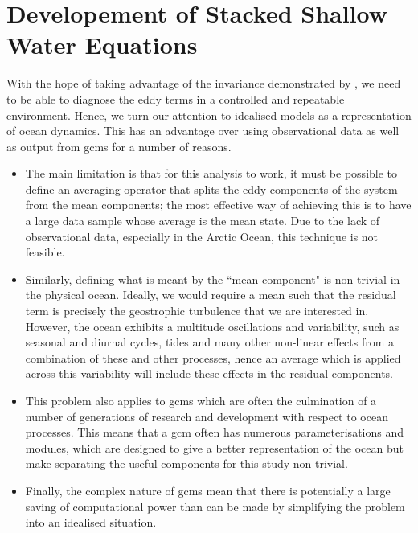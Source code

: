 \documentclass[12pt,a4paper]{report}
\begin{document}
\chapter{Developement of Stacked Shallow Water Equations}
\label{sweq}

With the hope of taking advantage of the invariance demonstrated by 
\cite{maddison2013eliassen}, we need to be able to diagnose the
eddy terms in a controlled and repeatable environment. Hence, we turn our attention to
idealised models as a representation of ocean dynamics. This has an advantage 
over using observational data as well as output from \glspl{gcm} for a number of reasons.
\begin{itemize}
	\item The main limitation is that for this analysis to work, it must be possible to define an
	averaging operator that splits the eddy components of the system from the mean
	components; the most effective way of achieving this is to have a large data sample
	whose average is the mean state. Due to the lack of observational data, especially in the
	Arctic Ocean, this  technique is not feasible.
	\item Similarly, defining what is meant by the ``mean component" is non-trivial in the physical ocean. Ideally, we would require a mean such that the residual term is precisely the 
	geostrophic turbulence that we are interested in. However, the ocean exhibits a multitude 
	oscillations and variability, such as seasonal and diurnal cycles, tides and many other
	non-linear effects from a combination of these and other processes, hence an average which
	is applied across this variability will include these effects in the residual components.
	\item This problem also applies to \glspl{gcm} which are often the culmination of 
	a number of generations of research and development with respect to ocean processes.
	This means that a \gls{gcm} often has numerous parameterisations and modules, which are
	designed to give a better representation of the ocean but make separating the useful components
	for this study non-trivial. 
	\item Finally, the complex nature of \glspl{gcm} mean that there is potentially a large saving
	of computational power than can be made by simplifying the problem into an idealised situation.
\end{itemize}
\end{document}
